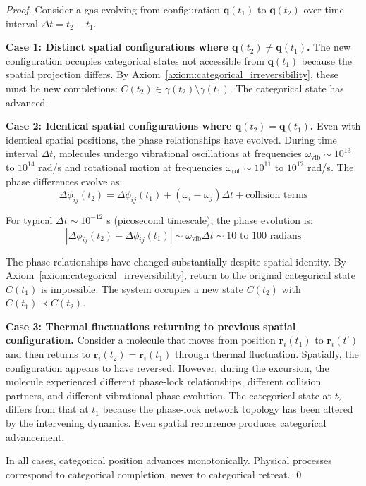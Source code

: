 \documentclass[12pt,a4paper]{article}
\theoremstyle{definition}
\theoremstyle{remark}
\begin{document}
\begin{proof}
Consider a gas evolving from configuration $\mathbf{q}(t_1)$ to $\mathbf{q}(t_2)$ over time interval $\Delta t = t_2 - t_1$.

\textbf{Case 1: Distinct spatial configurations where $\mathbf{q}(t_2) \neq \mathbf{q}(t_1)$.}
The new configuration occupies categorical states not accessible from $\mathbf{q}(t_1)$ because the spatial projection differs. By Axiom~\ref{axiom:categorical_irreversibility}, these must be new completions: $C(t_2) \in \gamma(t_2) \setminus \gamma(t_1)$. The categorical state has advanced.

\textbf{Case 2: Identical spatial configurations where $\mathbf{q}(t_2) = \mathbf{q}(t_1)$.}
Even with identical spatial positions, the phase relationships have evolved. During time interval $\Delta t$, molecules undergo vibrational oscillations at frequencies $\omega_{\text{vib}} \sim 10^{13}$ to $10^{14}$ rad/s and rotational motion at frequencies $\omega_{\text{rot}} \sim 10^{11}$ to $10^{12}$ rad/s. The phase differences evolve as:
\begin{equation}
\Delta\phi_{ij}(t_2) = \Delta\phi_{ij}(t_1) + (\omega_i - \omega_j) \Delta t + \text{collision terms}
\end{equation}

For typical $\Delta t \sim 10^{-12}$ s (picosecond timescale), the phase evolution is:
\begin{equation}
|\Delta\phi_{ij}(t_2) - \Delta\phi_{ij}(t_1)| \sim \omega_{\text{vib}} \Delta t \sim 10 \text{ to } 100 \text{ radians}
\end{equation}

The phase relationships have changed substantially despite spatial identity. By Axiom~\ref{axiom:categorical_irreversibility}, return to the original categorical state $C(t_1)$ is impossible. The system occupies a new state $C(t_2)$ with $C(t_1) \prec C(t_2)$.

\textbf{Case 3: Thermal fluctuations returning to previous spatial configuration.}
Consider a molecule that moves from position $\mathbf{r}_i(t_1)$ to $\mathbf{r}_i(t')$ and then returns to $\mathbf{r}_i(t_2) = \mathbf{r}_i(t_1)$ through thermal fluctuation. Spatially, the configuration appears to have reversed. However, during the excursion, the molecule experienced different phase-lock relationships, different collision partners, and different vibrational phase evolution. The categorical state at $t_2$ differs from that at $t_1$ because the phase-lock network topology has been altered by the intervening dynamics. Even spatial recurrence produces categorical advancement.

In all cases, categorical position advances monotonically. Physical processes correspond to categorical completion, never to categorical retreat. \qed
\end{proof}
\end{document}
